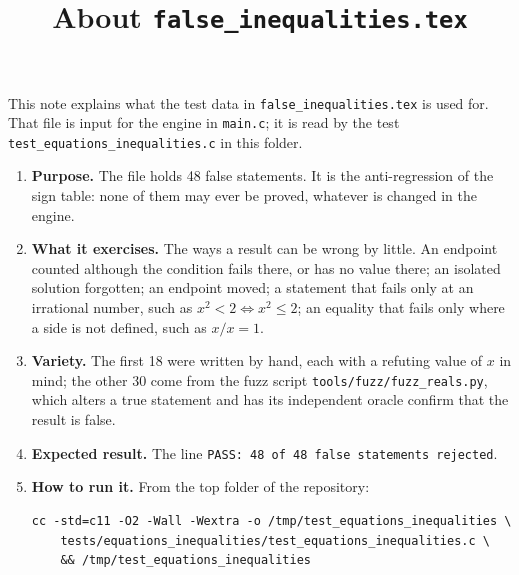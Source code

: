 \documentclass[11pt,a4paper]{article}
\title{About \texttt{false\_inequalities.tex}}
\author{}
\date{}
\begin{document}
\maketitle
This note explains what the test data in \texttt{false\_inequalities.tex} is used for. That file is input for the engine in \texttt{main.c}; it is read by the test \texttt{test\_equations\_inequalities.c} in this folder.

\begin{enumerate}
\item \textbf{Purpose.} The file holds 48 false statements. It is the anti-regression of the sign table: none of them may ever be proved, whatever is changed in the engine.

\item \textbf{What it exercises.} The ways a result can be wrong by little. An endpoint counted although the condition fails there, or has no value there; an isolated solution forgotten; an endpoint moved; a statement that fails only at an irrational number, such as $x^{2} < 2 \iff x^{2} \le 2$; an equality that fails only where a side is not defined, such as $x/x = 1$.

\item \textbf{Variety.} The first 18 were written by hand, each with a refuting value of $x$ in mind; the other 30 come from the fuzz script \texttt{tools/fuzz/fuzz\_reals.py}, which alters a true statement and has its independent oracle confirm that the result is false.

\item \textbf{Expected result.} The line \texttt{PASS: 48 of 48 false statements rejected}.

\item \textbf{How to run it.} From the top folder of the repository:
\begin{verbatim}
cc -std=c11 -O2 -Wall -Wextra -o /tmp/test_equations_inequalities \
    tests/equations_inequalities/test_equations_inequalities.c \
    && /tmp/test_equations_inequalities
\end{verbatim}
\end{enumerate}
\end{document}
